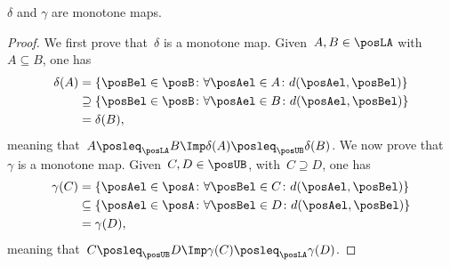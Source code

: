 \begin{lemma}
  \label{lem:deltagammamonotone}
  $\delta$ and $\gamma$ are monotone maps.
\end{lemma}
\begin{proof}
  We first prove that~$\delta$ is a monotone map. Given~$A,B\in \posLA$ with~$A\subseteq B$, one has
  \begin{equation}
    \begin{aligned}
      \delta(A)&=\{\posBel\in \posB\colon \forall \posAel \in A\colon d(\posAel,\posBel)\}\\
      &\supseteq \{\posBel\in \posB\colon \forall \posAel\in B \colon d(\posAel,\posBel)\}\\
      &=\delta(B),
    \end{aligned}
  \end{equation}
  meaning that~$A\posleq_{\posLA} B \Imp \delta(A)\posleq_{\posUB} \delta(B)$.
  We now prove that~$\gamma$ is a monotone map. Given~$C,D\in \posUB$, with~$C\supseteq D$, one has
  \begin{equation}
    \begin{aligned}
      \gamma(C)&=\{\posAel\in \posA\colon \forall \posBel \in C\colon d(\posAel,\posBel)\}\\
      &\subseteq \{\posAel\in \posA\colon \forall \posBel \in D \colon d(\posAel,\posBel)\}\\
      &=\gamma(D),
    \end{aligned}
  \end{equation}
  meaning that~$C\posleq_{\posUB} D \Imp \gamma(C)\posleq_{\posLA} \gamma(D)$.
\end{proof}

